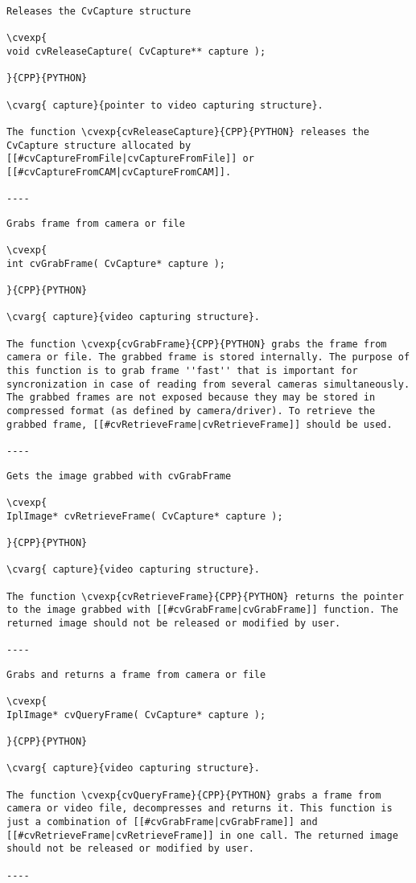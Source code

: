 \begin{verbatim}
Releases the CvCapture structure

\cvexp{
void cvReleaseCapture( CvCapture** capture );

}{CPP}{PYTHON}

\cvarg{ capture}{pointer to video capturing structure}.

The function \cvexp{cvReleaseCapture}{CPP}{PYTHON} releases the CvCapture structure allocated by [[#cvCaptureFromFile|cvCaptureFromFile]] or [[#cvCaptureFromCAM|cvCaptureFromCAM]].

----
\end{verbatim}
\begin{verbatim}
Grabs frame from camera or file

\cvexp{
int cvGrabFrame( CvCapture* capture );

}{CPP}{PYTHON}

\cvarg{ capture}{video capturing structure}.

The function \cvexp{cvGrabFrame}{CPP}{PYTHON} grabs the frame from camera or file. The grabbed frame is stored internally. The purpose of this function is to grab frame ''fast'' that is important for syncronization in case of reading from several cameras simultaneously. The grabbed frames are not exposed because they may be stored in compressed format (as defined by camera/driver). To retrieve the grabbed frame, [[#cvRetrieveFrame|cvRetrieveFrame]] should be used.

----
\end{verbatim}
\begin{verbatim}
Gets the image grabbed with cvGrabFrame

\cvexp{
IplImage* cvRetrieveFrame( CvCapture* capture );

}{CPP}{PYTHON}

\cvarg{ capture}{video capturing structure}.

The function \cvexp{cvRetrieveFrame}{CPP}{PYTHON} returns the pointer to the image grabbed with [[#cvGrabFrame|cvGrabFrame]] function. The returned image should not be released or modified by user.

----
\end{verbatim}
\begin{verbatim}
Grabs and returns a frame from camera or file

\cvexp{
IplImage* cvQueryFrame( CvCapture* capture );

}{CPP}{PYTHON}

\cvarg{ capture}{video capturing structure}.

The function \cvexp{cvQueryFrame}{CPP}{PYTHON} grabs a frame from camera or video file, decompresses and returns it. This function is just a combination of [[#cvGrabFrame|cvGrabFrame]] and [[#cvRetrieveFrame|cvRetrieveFrame]] in one call. The returned image should not be released or modified by user.

----
\end{verbatim}
